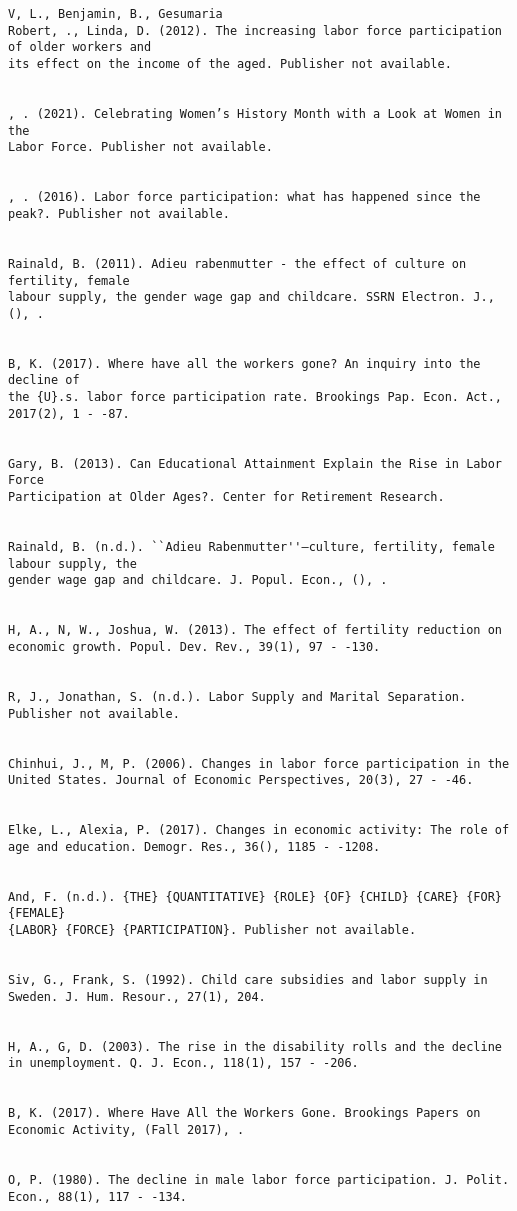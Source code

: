 \begin{verbatim}
V, L., Benjamin, B., Gesumaria
Robert, ., Linda, D. (2012). The increasing labor force participation of older workers and
its effect on the income of the aged. Publisher not available.


, . (2021). Celebrating Women’s History Month with a Look at Women in the
Labor Force. Publisher not available.


, . (2016). Labor force participation: what has happened since the peak?. Publisher not available.


Rainald, B. (2011). Adieu rabenmutter - the effect of culture on fertility, female
labour supply, the gender wage gap and childcare. SSRN Electron. J., (), .


B, K. (2017). Where have all the workers gone? An inquiry into the decline of
the {U}.s. labor force participation rate. Brookings Pap. Econ. Act., 2017(2), 1 - -87.


Gary, B. (2013). Can Educational Attainment Explain the Rise in Labor Force
Participation at Older Ages?. Center for Retirement Research.


Rainald, B. (n.d.). ``Adieu Rabenmutter''—culture, fertility, female labour supply, the
gender wage gap and childcare. J. Popul. Econ., (), .


H, A., N, W., Joshua, W. (2013). The effect of fertility reduction on economic growth. Popul. Dev. Rev., 39(1), 97 - -130.


R, J., Jonathan, S. (n.d.). Labor Supply and Marital Separation. Publisher not available.


Chinhui, J., M, P. (2006). Changes in labor force participation in the United States. Journal of Economic Perspectives, 20(3), 27 - -46.


Elke, L., Alexia, P. (2017). Changes in economic activity: The role of age and education. Demogr. Res., 36(), 1185 - -1208.


And, F. (n.d.). {THE} {QUANTITATIVE} {ROLE} {OF} {CHILD} {CARE} {FOR} {FEMALE}
{LABOR} {FORCE} {PARTICIPATION}. Publisher not available.


Siv, G., Frank, S. (1992). Child care subsidies and labor supply in Sweden. J. Hum. Resour., 27(1), 204.


H, A., G, D. (2003). The rise in the disability rolls and the decline in unemployment. Q. J. Econ., 118(1), 157 - -206.


B, K. (2017). Where Have All the Workers Gone. Brookings Papers on Economic Activity, (Fall 2017), .


O, P. (1980). The decline in male labor force participation. J. Polit. Econ., 88(1), 117 - -134.
\end{verbatim}